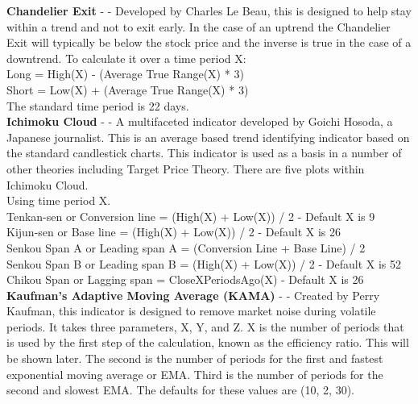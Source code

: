 \documentclass[12pt,a4paper]{article}
\begin{document}
\noindent
\textbf{Chandelier Exit} - \cite{Elder2002} - Developed by Charles Le Beau, this is designed to help stay within a trend and not to exit early. In the case of an uptrend the Chandelier Exit will typically be below the stock price and the inverse is true in the case of a downtrend. To calculate it over a time period X:\\

\noindent
Long = High(X) - (Average True Range(X) * 3)\\
Short = Low(X) + (Average True Range(X) * 3)\\
\noindent
The standard time period is 22 days.\\

\iffalse
[]
\fi

\noindent
\textbf{Ichimoku Cloud} - \cite{Murphy1999} - A multifaceted indicator developed by Goichi Hosoda, a Japanese journalist. This is an average based trend identifying indicator based on the standard candlestick charts. This indicator is used as a basis in a number of other theories including Target Price Theory. There are five plots within Ichimoku Cloud.\\

\noindent
Using time period X.\\
Tenkan-sen or Conversion line = (High(X) + Low(X)) / 2  - Default X is 9 \\
Kijun-sen or Base line = (High(X) + Low(X)) / 2 - Default X is 26 \\
Senkou Span A or Leading span A = (Conversion Line + Base Line) / 2 \\
Senkou Span B or Leading span B = (High(X) + Low(X)) / 2 - Default X is 52 \\
Chikou Span or Lagging span = CloseXPeriodsAgo(X) - Default X is 26\\

\iffalse
[]
\fi

\noindent
\textbf{Kaufman's Adaptive Moving Average (KAMA)} - \cite{Kaufman1998} - Created by Perry Kaufman, this indicator is designed to remove market noise during volatile periods. It takes three parameters, X, Y, and Z. X is the number of periods that is used by the first step of the calculation, known as the efficiency ratio. This will be shown later. The second is the number of periods for the first and fastest exponential moving average or EMA. Third is the number of periods for the second and slowest EMA. The defaults for these values are (10, 2, 30). \\
\end{document}
